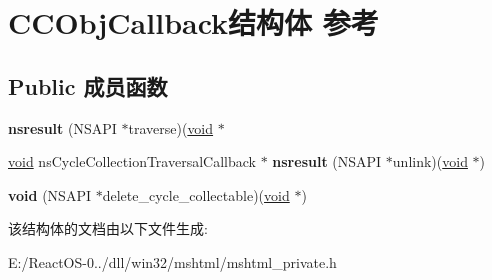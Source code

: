 \hypertarget{struct_c_c_obj_callback}{}\section{C\+C\+Obj\+Callback结构体 参考}
\label{struct_c_c_obj_callback}
\subsection*{Public 成员函数}
\begin{DoxyCompactItemize}
\item 
\mbox{\label{struct_c_c_obj_callback_a40ce3ed7936b2bbfdcb4a3211ef30131}} 
{\bfseries nsresult} (N\+S\+A\+PI $\ast$traverse)(\hyperlink{interfacevoid}{void} $\ast$
\item 
\mbox{\label{struct_c_c_obj_callback_a64acbd6224053aaaa8ed39b7e0875ef3}} 
\hyperlink{interfacevoid}{void} ns\+Cycle\+Collection\+Traversal\+Callback $\ast$ {\bfseries nsresult} (N\+S\+A\+PI $\ast$unlink)(\hyperlink{interfacevoid}{void} $\ast$)
\item 
\mbox{\label{struct_c_c_obj_callback_ae8d10cd64cbe05def5de125a56a9001d}} 
{\bfseries void} (N\+S\+A\+PI $\ast$delete\+\_\+cycle\+\_\+collectable)(\hyperlink{interfacevoid}{void} $\ast$)
\end{DoxyCompactItemize}


该结构体的文档由以下文件生成\+:\begin{DoxyCompactItemize}
\item 
E\+:/\+React\+O\+S-\/0../dll/win32/mshtml/mshtml\+\_\+private.\+h\end{DoxyCompactItemize}

